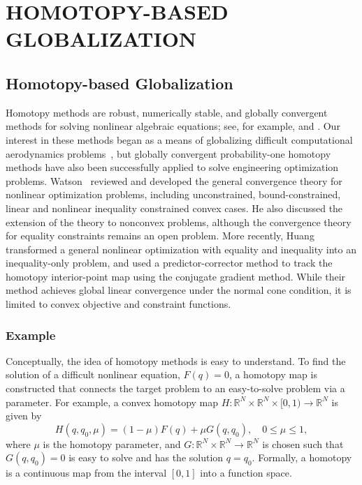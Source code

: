  
\chapter{HOMOTOPY-BASED GLOBALIZATION}

\section{Homotopy-based Globalization}\label{sec:homotopy}
Homotopy methods are robust, numerically stable, and globally convergent methods
for solving nonlinear algebraic equations; see, for example,
\cite{allgower_georg_1993} and \cite{Watson_1989}.  Our interest in these
methods began as a means of globalizing difficult computational aerodynamics
problems~\cite{hicken:cfd2009, hicken:cfd2011b, Brown_2016}, but globally
convergent probability-one homotopy methods have also been successfully applied
to solve engineering optimization problems.  Watson~\cite{Watson_2001} reviewed
and developed the general convergence theory for nonlinear optimization
problems, including unconstrained, bound-constrained, linear and nonlinear
inequality constrained convex cases.  He also discussed the extension of the
theory to nonconvex problems, although the convergence theory for equality
constraints remains an open problem.  More recently, Huang
\etal~\cite{huang_2012pc} transformed a general nonlinear optimization with
equality and inequality into an inequality-only problem, and used a
predictor-corrector method to track the homotopy interior-point map using the
conjugate gradient method. While their method achieves global linear convergence
under the normal cone condition, it is limited to convex objective and
constraint functions.

\subsection{Example}

Conceptually, the idea of homotopy methods is easy to understand. To find the
solution of a difficult nonlinear equation, $F(q)=0$, a homotopy map is
constructed that connects the target problem to an easy-to-solve problem via a
parameter.  For example, a convex homotopy map $H : \mathbb{R}^N \times
\mathbb{R}^{N} \times [0,1) \rightarrow \mathbb{R}^N$ is given by
\begin{equation}\label{eq:homotopy}
H(q, q_0, \mu) = (1-\mu) F(q) + \mu G(q,q_0),\quad 0 \leq \mu \leq 1,
\end{equation}
where $\mu$ is the homotopy parameter, and $G : \mathbb{R}^N\times\mathbb{R}^{N}
\rightarrow \mathbb{R}^N$ is chosen such that $G(q,q_0)=0$ is easy to solve and
has the solution $q=q_0$.  Formally, a homotopy is a continuous map from the
interval $[0,1]$ into a function space.

